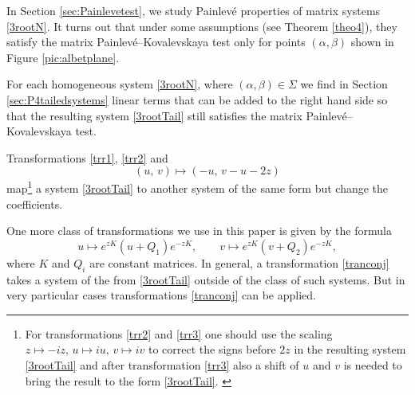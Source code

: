 \documentclass{article}
\theoremstyle{plain}
\newcommand{\brackets}[1]{\left( #1 \right)}
\newcommand{\PPainleve}{Painlev{\'e}}
\begin{document}
In Section \ref{sec:Painlevetest}, we study Painlev\'e properties of matrix systems \eqref{3rootN}. It turns out that under some assumptions (see Theorem \ref{theo4}), they satisfy the matrix \PPainleve--Kovalevskaya test \cite{Balandin_Sokolov_1998} only for points $(\alpha, \beta)$ shown in Figure \ref{pic:albetplane}. 

For each homogeneous system \eqref{3rootN}, where  $(\alpha, \beta)\in \Sigma$   we find in Section \ref{sec:P4tailedsystems} linear terms that can be added to the right hand side so that the resulting system \eqref{3rootTail} still satisfies the matrix \PPainleve--Kovalevskaya test. 

Transformations \eqref{trr1}, \eqref{trr2}
and
\begin{equation}\label{trr3}
    (u,\,v) \mapsto (-u,\,v-u - 2 z) 
\end{equation}
map\footnote{For transformations \eqref{trr2} and \eqref{trr3} one should use the scaling $z\mapsto-i z,\, u\mapsto i u, \, v \mapsto i v$ to correct the signs before $2 z$ in the resulting system \eqref{3rootTail} and after transformation \eqref{trr3} also a shift of $u$ and $v$ is needed to bring the result to the form \eqref{3rootTail}. \label{footnote:scal}} a system \eqref{3rootTail} to another system of the same form but change the coefficients.

One more class of transformations we use in this paper is given by the formula
\begin{equation} \label{tranconj}
    u 
     \mapsto e^{z K} 
    \brackets{u + Q_1} 
    e^{- z K},
    \qquad 
    v \mapsto e^{z K} 
    \brackets{v + Q_2} 
    e^{- z K},
\end{equation}
where $K$ and $Q_i$ are constant matrices.
In general, a transformation \eqref{tranconj} takes a system of the from \eqref{3rootTail} outside of the class of such systems. But in very particular cases transformations \eqref{tranconj} can be applied. 
\end{document}
